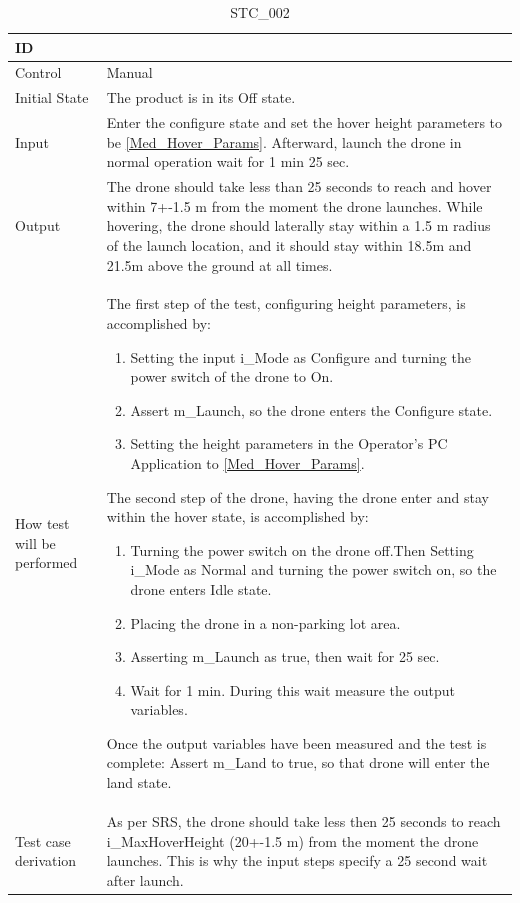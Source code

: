 \documentclass[12pt, titlepage]{article}
\begin{document}
\begin{enumerate}
\begin{table}[!h]
\begin{center}
\caption {STC\_002}
\label{tab:STC_002}
\begin{tabular}{ | m{1.5cm} | m{15cm} | } 
\hline
ID & \nameref{tab:STC_002}  \\ 
\hline
Control & Manual\\ 
\hline
Initial State & The product is in its Off state.
 \\ 
\hline
Input & Enter the configure state and set the hover height parameters to be \ref{Med_Hover_Params}. Afterward, launch the drone in normal operation wait for 1 min 25 sec. \\ 
\hline
Output & The drone should take less than 25 seconds to reach and hover within 7+-1.5 m from the moment the drone launches. While hovering, the drone should laterally stay within a 1.5 m radius of the launch location, and it should stay within 18.5m and 21.5m above the ground at all times. 
 \\ 
\hline
How test will be performed &
The first step of the test, configuring height parameters, is accomplished by:
\begin{enumerate}[topsep=0pt,itemsep=-1ex,partopsep=1ex,parsep=1ex]
    \item Setting the input i\_Mode as Configure and turning the power switch of the drone to On.
    \item Assert m\_Launch, so the drone enters the Configure state.
    \item Setting the height parameters in the Operator's PC Application to \ref{Med_Hover_Params}.
\end{enumerate}
The second step of the drone, having the drone enter and stay within the hover state, is accomplished by:
\begin{enumerate}[topsep=0pt,itemsep=-1ex,partopsep=1ex,parsep=1ex]
	\item Turning the power switch on the drone off.Then Setting i\_Mode as Normal and turning the power switch on, so the drone enters  Idle state.
	\item Placing the drone in a non-parking lot area. 
	\item Asserting m\_Launch as true, then wait for 25 sec.
	\item Wait for 1 min. During this wait measure the output variables.
\end{enumerate}
Once the output variables have been measured and the test is complete:
Assert m_Land to true, so that drone will enter the land state.\\ 
\hline
Test case derivation & As per SRS, the drone should take less then 25 seconds to reach i\_MaxHoverHeight (20+-1.5 m) from the moment the drone launches. This is why the input steps specify a 25 second wait after launch.


\end{tabular}
\end{center}
\end{table}
\end{enumerate}
\end{document}
